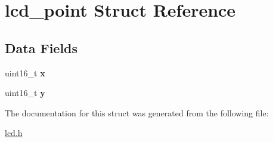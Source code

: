 \hypertarget{structlcd__point}{}\section{lcd\+\_\+point Struct Reference}
\label{structlcd__point}
\subsection*{Data Fields}
\begin{DoxyCompactItemize}
\item 
\hypertarget{structlcd__point_acd6696800d20fb19df5d588b24b95fa2}{}uint16\+\_\+t {\bfseries x}\label{structlcd__point_acd6696800d20fb19df5d588b24b95fa2}

\item 
\hypertarget{structlcd__point_ad5515257673befbe15f4374d822da942}{}uint16\+\_\+t {\bfseries y}\label{structlcd__point_ad5515257673befbe15f4374d822da942}

\end{DoxyCompactItemize}


The documentation for this struct was generated from the following file\+:\begin{DoxyCompactItemize}
\item 
\hyperlink{lcd_8h}{lcd.\+h}\end{DoxyCompactItemize}

